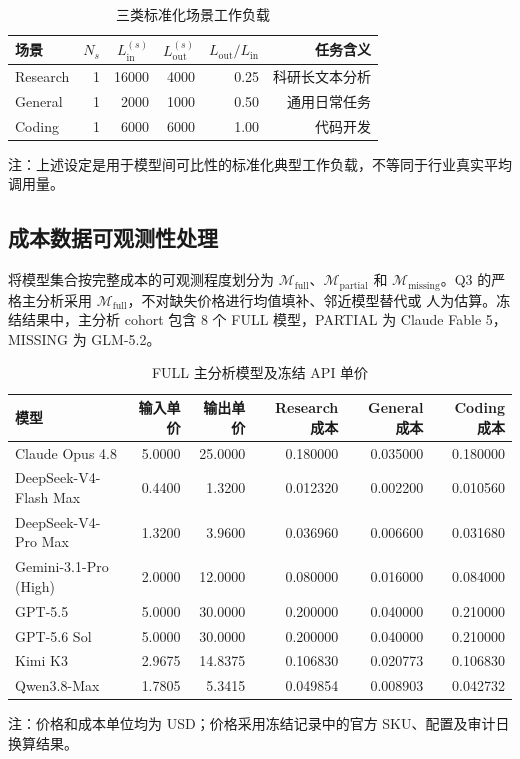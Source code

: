 \documentclass[UTF8,a4paper,11pt]{ctexart}
\newcommand{\model}[1]{\textsf{#1}}
\begin{document}
\begin{table}[htbp]
\centering
\caption{三类标准化场景工作负载}
\label{tab:workload}
\small
\begin{tabular}{lrrrrr}
\toprule
场景 & $N_s$ & $L_{\mathrm{in}}^{(s)}$ & $L_{\mathrm{out}}^{(s)}$ &
$L_{\mathrm{out}}/L_{\mathrm{in}}$ & 任务含义\\
\midrule
Research & 1 & 16000 & 4000 & 0.25 & 科研长文本分析\\
General & 1 & 2000 & 1000 & 0.50 & 通用日常任务\\
Coding & 1 & 6000 & 6000 & 1.00 & 代码开发\\
\bottomrule
\end{tabular}

\vspace{0.3em}
\footnotesize 注：上述设定是用于模型间可比性的标准化典型工作负载，不等同于行业真实平均调用量。
\end{table}

\subsection{成本数据可观测性处理}

将模型集合按完整成本的可观测程度划分为
$\mathcal M_{\mathrm{full}}$、$\mathcal M_{\mathrm{partial}}$ 和
$\mathcal M_{\mathrm{missing}}$。Q3 的严格主分析采用
$\mathcal M_{\mathrm{full}}$，不对缺失价格进行均值填补、邻近模型替代或
人为估算。冻结结果中，主分析 cohort 包含 8 个 FULL 模型，PARTIAL 为
Claude Fable 5，MISSING 为 GLM-5.2。

\begin{table}[htbp]
\centering
\caption{FULL 主分析模型及冻结 API 单价}
\label{tab:price}
\small
\setlength{\tabcolsep}{3.5pt}
\begin{tabular}{lrrrrr}
\toprule
模型 & 输入单价 & 输出单价 & Research 成本 & General 成本 & Coding 成本\\
\midrule
\model{Claude Opus 4.8} & 5.0000 & 25.0000 & 0.180000 & 0.035000 & 0.180000\\
\model{DeepSeek-V4-Flash Max} & 0.4400 & 1.3200 & 0.012320 & 0.002200 & 0.010560\\
\model{DeepSeek-V4-Pro Max} & 1.3200 & 3.9600 & 0.036960 & 0.006600 & 0.031680\\
\model{Gemini-3.1-Pro (High)} & 2.0000 & 12.0000 & 0.080000 & 0.016000 & 0.084000\\
\model{GPT-5.5} & 5.0000 & 30.0000 & 0.200000 & 0.040000 & 0.210000\\
\model{GPT-5.6 Sol} & 5.0000 & 30.0000 & 0.200000 & 0.040000 & 0.210000\\
\model{Kimi K3} & 2.9675 & 14.8375 & 0.106830 & 0.020773 & 0.106830\\
\model{Qwen3.8-Max} & 1.7805 & 5.3415 & 0.049854 & 0.008903 & 0.042732\\
\bottomrule
\end{tabular}

\vspace{0.3em}
\footnotesize 注：价格和成本单位均为 USD；价格采用冻结记录中的官方 SKU、配置及审计日换算结果。
\end{table}
\end{document}
